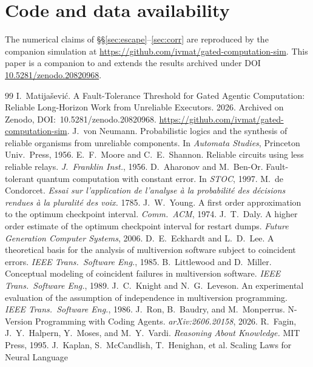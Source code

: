 \documentclass[11pt]{article}
\theoremstyle{definition}
\theoremstyle{remark}
\begin{document}
\section*{Code and data availability}
The numerical claims of \S\S\ref{sec:escape}--\ref{sec:corr} are reproduced by the companion
simulation at \url{https://github.com/ivmat/gated-computation-sim}. This paper is a companion to and
extends the results archived under DOI
\href{https://doi.org/10.5281/zenodo.20820968}{10.5281/zenodo.20820968}.

\begin{thebibliography}{99}
\small
{} I.~Matija\v{s}evi\'c. A Fault-Tolerance Threshold for Gated Agentic
Computation: Reliable Long-Horizon Work from Unreliable Executors. 2026.
Archived on Zenodo, DOI:~10.5281/zenodo.20820968.
\url{https://github.com/ivmat/gated-computation-sim}.
 J.~von Neumann. Probabilistic logics and the synthesis of reliable
organisms from unreliable components. In \emph{Automata Studies}, Princeton Univ.\ Press, 1956.
 E.~F.~Moore and C.~E.~Shannon. Reliable circuits using less reliable relays.
\emph{J.~Franklin Inst.}, 1956.
 D.~Aharonov and M.~Ben-Or. Fault-tolerant quantum computation with constant
error. In \emph{STOC}, 1997.
 M.~de Condorcet. \emph{Essai sur l'application de l'analyse \`a la
probabilit\'e des d\'ecisions rendues \`a la pluralit\'e des voix.} 1785.
 J.~W.~Young. A first order approximation to the optimum checkpoint interval.
\emph{Comm.\ ACM}, 1974.
 J.~T.~Daly. A higher order estimate of the optimum checkpoint interval for
restart dumps. \emph{Future Generation Computer Systems}, 2006.
 D.~E.~Eckhardt and L.~D.~Lee. A theoretical basis for the analysis of
multiversion software subject to coincident errors. \emph{IEEE Trans.\ Software Eng.}, 1985.
 B.~Littlewood and D.~Miller. Conceptual modeling of coincident failures
in multiversion software. \emph{IEEE Trans.\ Software Eng.}, 1989.
 J.~C.~Knight and N.~G.~Leveson. An experimental evaluation of the assumption
of independence in multiversion programming. \emph{IEEE Trans.\ Software Eng.}, 1986.
 J.~Ron, B.~Baudry, and M.~Monperrus. N-Version Programming with Coding Agents.
\emph{arXiv:2606.20158}, 2026.
 R.~Fagin, J.~Y.~Halpern, Y.~Moses, and M.~Y.~Vardi. \emph{Reasoning About
Knowledge.} MIT Press, 1995.
 J.~Kaplan, S.~McCandlish, T.~Henighan, et al. Scaling Laws for Neural Language

\end{thebibliography}
\end{document}
